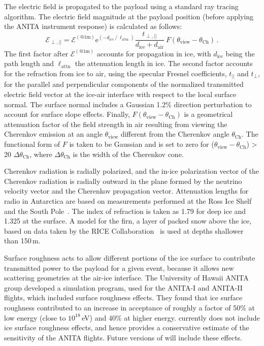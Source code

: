 The electric field is propagated to the payload using a standard ray tracing algorithm.
The electric field magnitude at the payload position (before applying
the ANITA instrument response) is calculated as follows:
\begin{equation}
 \mathcal{E}_{\perp,||} = \mathcal{E}^{(\mathrm{@ 1m})}  
 \mathrm{e}^{(-d_{\mathrm{ice}}\ /\ \ell_{\mathrm{attn}})}
 \frac{t_{\perp,||}}{d_{\mathrm{ice}} + d_{\mathrm{air}}}
 \ F(\theta_{\mathrm{view}}-\theta_{\mathrm{Ch}}) \,.
\end{equation}
The first factor after $\mathcal{E}^{(\mathrm{@ 1m})}$ accounts for propagation in ice, with $d_{\mathrm{ice}}$ being the path length and $\ell_{\mathrm{attn}}$ the attenuation length in ice. 
The second factor accounts for the refraction from ice to air, using
the specular Fresnel coefficients, $t_{||}$ and $t_{\perp}$, for the parallel and perpendicular components of the normalized transmitted electric field vector at the ice-air interface with respect to the local surface normal.
The surface normal includes a Gaussian 1.2\% direction perturbation to account for surface slope effects.
Finally, $F(\theta_{\mathrm{view}}-\theta_{\mathrm{Ch}})$ is a geometrical attenuation factor of the field strength in air resulting from viewing the Cherenkov emission at an angle $\theta_{\mathrm{view}}$ different from the Cherenkov angle $\theta_{\mathrm{Ch}}$.
The functional form of $F$ is taken to be Gaussian and is set to zero for ($\theta_{\mathrm{view}}-\theta_{\mathrm{Ch}}$) > 20 $\Delta \theta_{\mathrm{Ch}}$, where $\Delta \theta_{\mathrm{Ch}}$ is the width of the Cherenkov cone. 

Cherenkov radiation is radially polarized, and the in-ice polarization vector of the Cherenkov radiation is radially outward in the plane formed by
the neutrino velocity vector and the Cherenkov propagation vector.
Attenuation lengths for radio in Antarctica are based on measurements performed at the Ross Ice Shelf and the South Pole~\cite{smex}.
The index of refraction is taken as 1.79 for deep ice and 1.325 at the surface. A model for the firn, a layer of packed snow above the ice, based on data taken by the RICE Collaboration~\cite{PhysRevD.73.082002} is used at depths shallower than 150\,m.

Surface roughness acts to allow different portions of the ice surface to contribute transmitted power to the payload for a given event, because it allows new scattering geometries at the air-ice interface.
The University of Hawaii ANITA group developed a simulation program, used for the ANITA-I and ANITA-II flights, which included surface roughness effects. They found that ice surface roughness contributed to an increase in acceptance of roughly a factor of 50\% at low energy (close to $10^{18}$\,eV) and 40\% at higher energy.
\icemc currently does not include ice surface roughness effects, and hence provides a conservative estimate of the sensitivity of the ANITA flights. Future versions of \icemc will include these effects.

